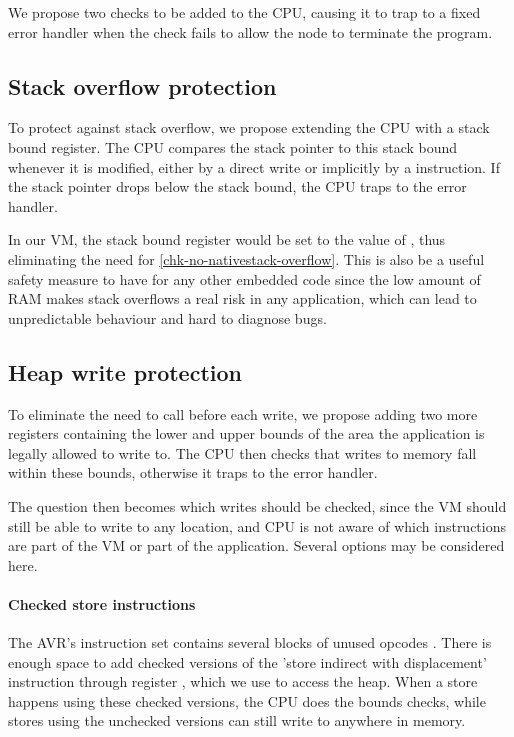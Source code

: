 We propose two checks to be added to the CPU, causing it to trap to a fixed error handler when the check fails to allow the node to terminate the program.

\subsection{Stack overflow protection}
To protect against stack overflow, we propose extending the CPU with a stack bound register. The CPU compares the stack pointer to this stack bound whenever it is modified, either by a direct write or implicitly by a  instruction. If the stack pointer drops below the stack bound, the CPU traps to the error handler.

In our VM, the stack bound register would be set to the value of , thus eliminating the need for \ref{chk-no-nativestack-overflow}. This is also be a useful safety measure to have for any other embedded code since the low amount of RAM makes stack overflows a real risk in any application, which can lead to unpredictable behaviour and hard to diagnose bugs.

\subsection{Heap write protection}
To eliminate the need to call  before each write, we propose adding two more registers containing the lower and upper bounds of the area the application is legally allowed to write to. The CPU then checks that writes to memory fall within these bounds, otherwise it traps to the error handler.

The question then becomes which writes should be checked, since the VM should still be able to write to any location, and CPU is not aware of which instructions are part of the VM or part of the application. Several options may be considered here.

\paragraph{Checked store instructions}
The AVR's instruction set contains several blocks of unused opcodes \cite{Atmel:AVRInstructionSetManual}. There is enough space to add checked versions of the 'store indirect with displacement' instruction through register , which we use to access the heap. When a store happens using these checked versions, the CPU does the bounds checks, while stores using the unchecked versions can still write to anywhere in memory.

